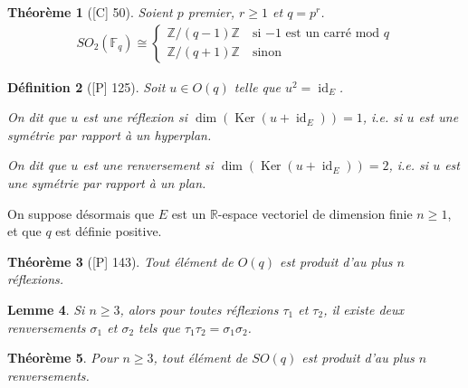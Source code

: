 \documentclass[10pt, a4paper, parskip=full, twoside, twocolumn]{report}
\newtheorem{definition}{Définition}
\newtheorem{theorem}[definition]{Théorème}
\newtheorem{lemma}[definition]{Lemme}
\newcommand{\IZ}{\mathbb{Z}}
\newcommand{\IF}{\mathbb{F}}
\newcommand{\IR}{\mathbb{R}}
\DeclareMathOperator{\Ker}{Ker}
\DeclareMathOperator{\id}{id}
\begin{document}
\begin{tcolorbox}[
    breakable, %
    colback=developpement, %
    colframe=gray!0!black, %
    boxrule=0pt, %
    arc=1mm, %
	boxsep=0pt,
	left=0pt, right=0pt, top=0pt, bottom=0pt
]
\begin{theorem}[\textnormal{[C] 50}]
	\label{106dev1}
	Soient $p$ premier, $r\geq 1$ et $q = p^r$.
	\begin{align*}
		SO_2(\IF_q) \cong \begin{cases}
			\IZ/(q-1)\IZ\quad\text{si $-1$ est un carré mod $q$} \\
			\IZ/(q+1)\IZ\quad \text{sinon}
		\end{cases}
	\end{align*}
\end{theorem}
\end{tcolorbox}

\begin{definition}[\textnormal{[P] 125}]
	Soit $u\in O(q)$ telle que $u^2 = \id_E$.
	
	On dit que $u$ est une \emph{réflexion} si $\dim(\Ker(u+\id_E)) = 1$, \emph{i.e.} si $u$ est une symétrie par rapport à un hyperplan.
	
	On dit que $u$ est une \emph{renversement} si $\dim(\Ker(u+\id_E)) = 2$, \emph{i.e.} si $u$ est une symétrie par rapport à un plan.
\end{definition}


\begin{tcolorbox}[
    breakable, %
    colback=developpement, %
    colframe=gray!0!black, %
    boxrule=0pt, %
    arc=1mm, %
	boxsep=0pt,
	left=0pt, right=0pt, top=0pt, bottom=0pt
]
On suppose désormais que $E$ est un $\IR$-espace vectoriel de dimension finie $n\geq 1$, et que $q$ est définie positive.
\begin{theorem}[\textnormal{[P] 143}]
	\label{106dev21}
	Tout élément de $O(q)$ est produit d'au plus $n$ réflexions.
\end{theorem}
\begin{lemma}
	\label{106dev22}
	Si $n\geq 3$, alors pour toutes réflexions $\tau_1$ et $\tau_2$, il existe deux renversements $\sigma_1$ et $\sigma_2$ tels que $\tau_1\tau_2 = \sigma_1\sigma_2$.
\end{lemma}
\begin{theorem}
	\label{106dev23}
	Pour $n\geq 3$, tout élément de $SO(q)$ est produit d'au plus $n$ renversements.
\end{theorem}
\end{tcolorbox}
\end{document}
